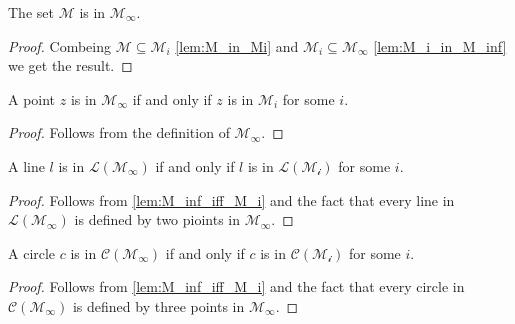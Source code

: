 \begin{lemma}
    \label{lem:M_in_M_inf}
    \leanok
    The set $\mathcal{M}$ is in $\mathcal{M}_{\infty}$.
\end{lemma}
\begin{proof}
    Combeing $\mathcal{M} \subseteq \mathcal{M}_i$ \ref{lem:M_in_Mi} and $\mathcal{M}_i \subseteq \mathcal{M}_{\infty}$ \ref{lem:M_i_in_M_inf} we get the result.
\end{proof}

\begin{lemma}
    \label{lem:M_inf_iff_M_i}
    \leanok
    A point $z$ is in $\mathcal{M}_{\infty}$ if and only if $z$ is in $\mathcal{M}_i$ for some $i$.
\end{lemma}
\begin{proof}
    Follows from the definition of $\mathcal{M}_{\infty}$.
\end{proof}

\begin{corollary}
    \label{cor:L_M_inf_iff_L_M_i}
    \leanok
    A line $l$ is in $\mathcal{L(M_{\infty})}$ if and only if $l$ is in $\mathcal{L(M_i)}$ for some $i$.
\end{corollary}
\begin{proof}
    Follows from \ref{lem:M_inf_iff_M_i} and the fact that every line in $\mathcal{L(M_{\infty})}$ is defined by two pioints in $\mathcal{M_{\infty}}$.
\end{proof}

\begin{corollary}
    \label{cor:C_M_inf_iff_C_M_i}
    \leanok
    A circle $c$ is in $\mathcal{C(M_{\infty})}$ if and only if $c$ is in $\mathcal{C(M_i)}$ for some $i$.
\end{corollary}
\begin{proof}
    Follows from \ref{lem:M_inf_iff_M_i} and the fact that every circle in $\mathcal{C(M_{\infty})}$ is defined by three points in $\mathcal{M_{\infty}}$.
\end{proof}

